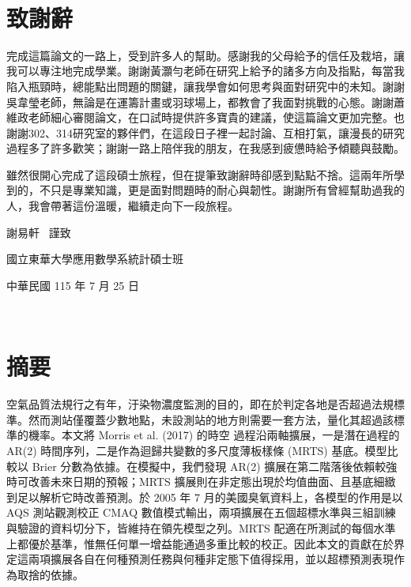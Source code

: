 \documentclass[12pt]{article}
\begin{document}
\newpage
\thispagestyle{empty}                   %
\WatermarkOff                           %
~ 

\newpage
\thispagestyle{empty}                   %
\WatermarkOn                            %
\section*{\centering 致謝辭}

\hspace*{1.5em}完成這篇論文的一路上，受到許多人的幫助。感謝我的父母給予的信任及栽培，讓我可以專注地完成學業。謝謝黃灝勻老師在研究上給予的諸多方向及指點，每當我陷入瓶頸時，總能點出問題的關鍵，讓我學會如何思考與面對研究中的未知。謝謝吳韋瑩老師，無論是在運籌計畫或羽球場上，都教會了我面對挑戰的心態。謝謝蕭維政老師細心審閱論文，在口試時提供許多寶貴的建議，使這篇論文更加完整。也謝謝302、314研究室的夥伴們，在這段日子裡一起討論、互相打氣，讓漫長的研究過程多了許多歡笑；謝謝一路上陪伴我的朋友，在我感到疲憊時給予傾聽與鼓勵。

雖然很開心完成了這段碩士旅程，但在提筆致謝辭時卻感到點點不捨。這兩年所學到的，不只是專業知識，更是面對問題時的耐心與韌性。謝謝所有曾經幫助過我的人，我會帶著這份溫暖，繼續走向下一段旅程。

\begin{flushright}
謝易軒 \ 謹致

國立東華大學應用數學系統計碩士班

中華民國 115 年 7 月 25 日
\end{flushright}

\newpage
\thispagestyle{empty}                 %
\WatermarkOff                         %
~ 

\newpage
\setcounter{page}{1}                    %
\WatermarkOn                            %
\section*{\centering 摘要}

\hspace*{1.5em}空氣品質法規行之有年，汙染物濃度監測的目的，即在於判定各地是否超過法規標準。然而測站僅覆蓋少數地點，未設測站的地方則需要一套方法，量化其超過該標準的機率。本文將 Morris et al. (2017) 的時空 \skewt 過程沿兩軸擴展，一是潛在過程的 AR(2) 時間序列，二是作為迴歸共變數的多尺度薄板樣條 (MRTS) 基底。模型比較以 Brier 分數為依據。在模擬中，我們發現 AR(2) 擴展在第二階落後依賴較強時可改善未來日期的預報；MRTS 擴展則在非定態出現於均值曲面、且基底細緻到足以解析它時改善預測。於 2005 年 7 月的美國臭氧資料上，各模型的作用是以 AQS 測站觀測校正 CMAQ 數值模式輸出，兩項擴展在五個超標水準與三組訓練與驗證的資料切分下，皆維持在領先模型之列。MRTS 配適在所測試的每個水準上都優於基準，惟無任何單一增益能通過多重比較的校正。因此本文的貢獻在於界定這兩項擴展各自在何種預測任務與何種非定態下值得採用，並以超標預測表現作為取捨的依據。
\end{document}
